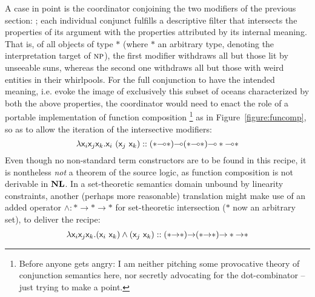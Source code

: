A case in point is the coordinator  conjoining the two modifiers of the previous section: ;
each individual conjunct fulfills a descriptive filter that intersects the properties of its argument with the properties attributed by its internal meaning.
That is, of all objects of type $*$ (where $*$ an arbitrary type, denoting the interpretation target of $\normalfont\textsc{np}$), the first modifier withdraws all but those lit by unseeable suns, whereas the second one withdraws all but those with weird entities in their whirlpools.
For the full conjunction to have the intended meaning, i.e. evoke the image of exclusively this subset of oceans characterized by both the above properties, the coordinator would need to enact the role of a portable implementation of function composition%
	\footnote{Before anyone gets angry: I am neither pitching some provocative theory of conjunction semantics here,  nor secretly advocating for the dot-combinator -- just trying to make a point.} 
as in Figure~\ref{figure:funcomp}, so as to allow the iteration of the intersective modifiers:
\begin{equation}\label{equation:funcomp}
\lam \smallterm{\vari\varj\vark.\vari~(\varj~\vark)} :: (*\li *)\li(*\li *)\li * \li *
\end{equation}
Even though no non-standard term constructors are to be found in this recipe, it is nontheless \textit{not} a theorem of the source logic, as function composition is not derivable in $\textbf{NL}$.
In a set-theoretic semantics domain unbound by linearity constraints, another (perhaps more reasonable) translation might make use of an added operator $\wedge : * \to * \to *$ for set-theoretic intersection ($*$ now an arbitrary set), to deliver the recipe:
\begin{equation}
\lam \smallterm{\vari\varj\vark.(\vari~\vark)\wedge(\varj~\vark)} :: (*\ii *)\ii(*\ii *)\ii * \ii *
\end{equation}


